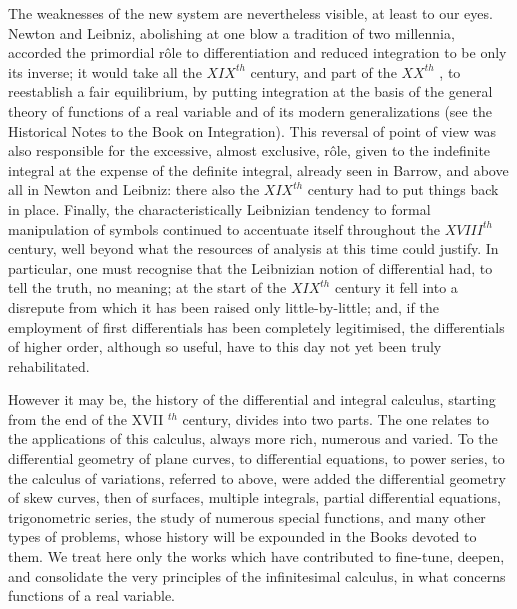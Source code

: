 The weaknesses of the new system are nevertheless visible, at least to our eyes. Newton and Leibniz, abolishing at one blow a tradition of two millennia, accorded the primordial rôle to differentiation and reduced integration to be only its inverse; it would take all the \(XIX^{th}\) century, and part of the \(XX^{th}\) , to reestablish a fair equilibrium, by putting integration at the basis of the general theory of functions of a real variable and of its modern generalizations (see the Historical Notes to the Book on Integration). This reversal of point of view was also responsible for the excessive, almost exclusive, rôle, given to the indefinite integral at the expense of the definite integral, already seen in Barrow, and above all in Newton and Leibniz: there also the \(XIX^{th}\) century had to put things back in place. Finally, the characteristically Leibnizian tendency to formal manipulation of symbols continued to accentuate itself throughout the \(XVIII^{th}\) century, well beyond what the resources of analysis at this time could justify. In particular, one must recognise that the Leibnizian notion of differential had, to tell the truth, no meaning; at the start of the \(XIX^{th}\) century it fell into a disrepute from which it has been raised only little-by-little; and, if the employment of first differentials has been completely legitimised, the differentials of higher order, although so useful, have to this day not yet been truly rehabilitated.

However it may be, the history of the differential and integral calculus, starting from the end of the XVII \(^{th}\) century, divides into two parts. The one relates to the applications of this calculus, always more rich, numerous and varied. To the differential geometry of plane curves, to differential equations, to power series, to the calculus of variations, referred to above, were added the differential geometry of skew curves, then of surfaces, multiple integrals, partial differential equations, trigonometric series, the study of numerous special functions, and many other types of problems, whose history will be expounded in the Books devoted to them. We treat here only the works which have contributed to fine-tune, deepen, and consolidate the very principles of the infinitesimal calculus, in what concerns functions of a real variable.

